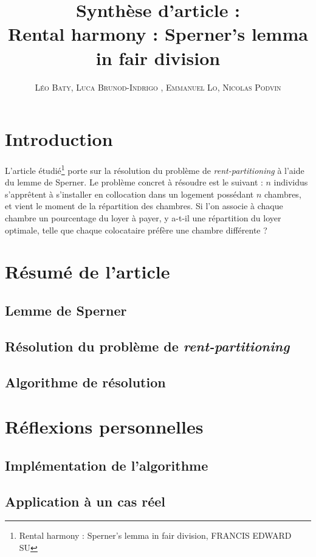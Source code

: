 \documentclass[12pt,twoside,a4paper]{article}
\title{\textbf{Synth\`ese d'article} :\\ Rental harmony : Sperner's lemma in fair division}
\author{\textsc{L\'eo Baty, Luca Brunod-Indrigo , Emmanuel Lo, Nicolas Podvin}}
\date{}
\begin{document}
\maketitle


\tableofcontents

\section{Introduction}

L'article \'etudi\'e\footnote{Rental harmony : Sperner's lemma in fair division, FRANCIS EDWARD SU} porte sur la r\'esolution du probl\`eme de \textit{rent-partitioning} \`a l'aide du lemme de Sperner. Le probl\`eme concret \`a r\'esoudre est le suivant : $n$ individus s'appr\^{e}tent \`a s'installer en collocation dans un logement poss\'edant $n$ chambres, et vient le moment de la r\'epartition des chambres. Si l'on associe \`a chaque chambre un pourcentage du loyer \`a payer, y a-t-il une r\'epartition du loyer optimale, telle que chaque colocataire pr\'ef\`ere une chambre diff\'erente ? 

\section{R\'esum\'e de l'article}

\subsection{Lemme de Sperner}

\subsection{R\'esolution du probl\`eme de \textit{rent-partitioning}}

\subsection{Algorithme de r\'esolution}

\section{R\'eflexions personnelles}

\subsection{Impl\'ementation de l'algorithme}

\subsection{Application \`a un cas r\'eel}
\end{document}
